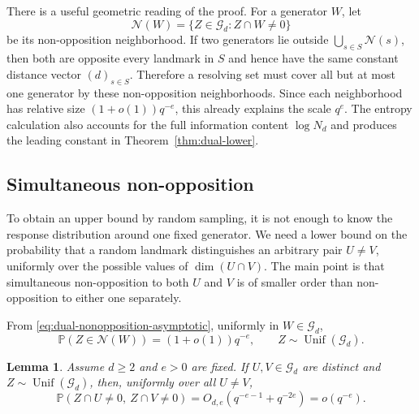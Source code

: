 \documentclass[11pt]{article}
\newtheorem{lemma}[theorem]{Lemma}
\theoremstyle{definition}
\theoremstyle{remark}
\newcommand{\Unif}{\operatorname{Unif}}
\newcommand{\Prob}{\mathbb P}
\begin{document}
There is a useful geometric reading of the proof.  For a generator $W$, 
let
\[
        \mathcal N(W)=\{Z\in\mathcal G_d:Z\cap W\neq0\}
\]
be its non-opposition neighborhood.  If two generators lie outside
$\bigcup_{s\in S}\mathcal N(s)$, then both are opposite every landmark in
$S$ and hence have the same constant distance vector $(d)_{s\in S}$.
Therefore a resolving set must cover all but at most one generator by 
these
non-opposition neighborhoods.  Since each neighborhood has relative size
$(1+o(1))q^{-e}$, this already explains the scale $q^e$.  The entropy
calculation also accounts for the full information content $\log N_d$ and
produces the leading constant in Theorem~\ref{thm:dual-lower}.

\subsection{Simultaneous non-opposition}

To obtain an upper bound by random sampling, it is not enough to know the
response distribution around one fixed generator.  We need a lower bound 
on
the probability that a random landmark distinguishes an arbitrary pair
$U\neq V$, uniformly over the possible values of $\dim(U\cap V)$.  The 
main
point is that simultaneous non-opposition to both $U$ and $V$ is of 
smaller
order than non-opposition to either one separately.

From \eqref{eq:dual-nonopposition-asymptotic}, uniformly in $W\in\mathcal 
G_d$,
\begin{equation}\label{eq:dual-one-nonopposition}
        \Prob(Z\in\mathcal N(W))=(1+o(1))q^{-e},
        \qquad Z\sim\Unif(\mathcal G_d).
\end{equation}

\begin{lemma}\label{lem:dual-both}
Assume $d\geq2$ and $e>0$ are fixed.  If $U,V\in\mathcal G_d$ are distinct
and $Z\sim\Unif(\mathcal G_d)$, then, uniformly over all $U\neq V$,
\[
        \Prob(Z\cap U\neq0,\ Z\cap V\neq0)
        =O_{d,e}(q^{-e-1}+q^{-2e})
        =o(q^{-e}).
\]
\end{lemma}
\end{document}
